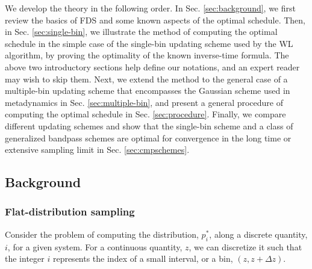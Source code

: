 \documentclass[reprint, superscriptaddress, floatfix]{revtex4-1}
\begin{document}
We develop the theory
in the following order.
%
In Sec. \ref{sec:background},
we first review the basics of FDS
and some known aspects of the optimal schedule.
%
Then, in Sec. \ref{sec:single-bin},
we illustrate the method of
computing the optimal schedule
in the simple case of the
single-bin updating scheme
used by the WL algorithm,
by proving the optimality
of the known inverse-time formula.
%
The above two introductory sections help define our notations,
and an expert reader may wish to skip them.
%
Next, we extend the method to the general case
of a multiple-bin updating scheme
that encompasses the Gaussian scheme used in metadynamics
in Sec. \ref{sec:multiple-bin},
and present a general procedure of computing the optimal schedule
in Sec. \ref{sec:procedure}.
%
Finally, we compare different updating schemes
and show that the single-bin scheme
and a class of generalized bandpass schemes
are optimal for convergence
in the long time or extensive sampling limit
in Sec. \ref{sec:cmpschemes}.



\subsection{\label{sec:background}
Background}



\subsubsection{\label{sec:FDS}
Flat-distribution sampling}



Consider the problem of computing
the distribution, $p^*_i$,
along a discrete quantity, $i$,
for a given system.
%
%
For a continuous quantity, $z$,
we can discretize it
such that the integer $i$ represents
the index of a small interval, or a bin,
$(z, z + \Delta z)$.
%
\end{document}
